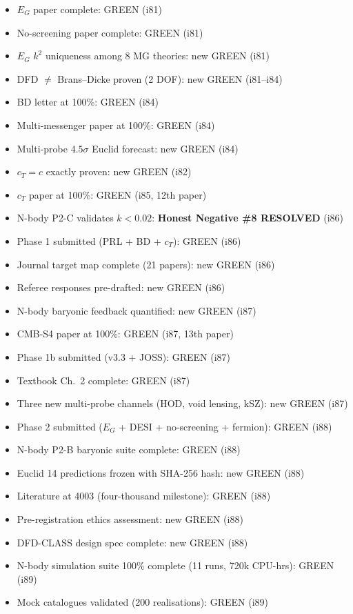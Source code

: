 \documentclass[11pt,a4paper]{article}
\begin{document}
\begin{itemize}[nosep]
\item $E_G$ paper complete: GREEN (i81)
\item No-screening paper complete: GREEN (i81)
\item $E_G$ $k^2$ uniqueness among 8 MG theories: new GREEN (i81)
\item DFD $\neq$ Brans--Dicke proven (2 DOF): new GREEN (i81--i84)
\item BD letter at 100\%: GREEN (i84)
\item Multi-messenger paper at 100\%: GREEN (i84)
\item Multi-probe $4.5\sigma$ Euclid forecast: new GREEN (i84)
\item $c_T = c$ exactly proven: new GREEN (i82)
\item $c_T$ paper at 100\%: GREEN (i85, 12th paper)
\item N-body P2-C validates $k < 0.02$: \textbf{Honest Negative \#8 RESOLVED} (i86)
\item Phase 1 submitted (PRL + BD + $c_T$): GREEN (i86)
\item Journal target map complete (21 papers): new GREEN (i86)
\item Referee responses pre-drafted: new GREEN (i86)
\item N-body baryonic feedback quantified: new GREEN (i87)
\item CMB-S4 paper at 100\%: GREEN (i87, 13th paper)
\item Phase 1b submitted (v3.3 + JOSS): GREEN (i87)
\item Textbook Ch.\ 2 complete: GREEN (i87)
\item Three new multi-probe channels (HOD, void lensing, kSZ): new GREEN (i87)
\item Phase 2 submitted ($E_G$ + DESI + no-screening + fermion): GREEN (i88)
\item N-body P2-B baryonic suite complete: GREEN (i88)
\item Euclid 14 predictions frozen with SHA-256 hash: new GREEN (i88)
\item Literature at 4003 (four-thousand milestone): GREEN (i88)
\item Pre-registration ethics assessment: new GREEN (i88)
\item DFD-CLASS design spec complete: new GREEN (i88)
\item N-body simulation suite 100\% complete (11 runs, 720k CPU-hrs): GREEN (i89)
\item Mock catalogues validated (200 realisations): GREEN (i89)

\end{itemize}
\end{document}
